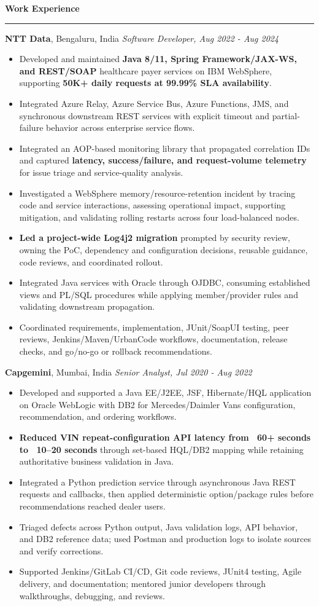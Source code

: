 \documentclass[11pt,letterpaper]{article}
\newcommand{\ressection}[1]{\Needspace{6\baselineskip}\vspace{8pt}\par\textbf{#1}\par\vspace{2pt}\hrule\vspace{5pt}}
\begin{document}
\ressection{Work Experience}
\textbf{NTT Data}, Bengaluru, India \hfill \textit{Software Developer, Aug 2022 - Aug 2024}
\begin{itemize}
  \item Developed and maintained \textbf{Java 8/11, Spring Framework/JAX-WS, and REST/SOAP} healthcare payer services on IBM WebSphere, supporting \textbf{50K+ daily requests at 99.99\% SLA availability}.
  \item Integrated Azure Relay, Azure Service Bus, Azure Functions, JMS, and synchronous downstream REST services with explicit timeout and partial-failure behavior across enterprise service flows.
  \item Integrated an AOP-based monitoring library that propagated correlation IDs and captured \textbf{latency, success/failure, and request-volume telemetry} for issue triage and service-quality analysis.
  \item Investigated a WebSphere memory/resource-retention incident by tracing code and service interactions, assessing operational impact, supporting mitigation, and validating rolling restarts across four load-balanced nodes.
  \item \textbf{Led a project-wide Log4j2 migration} prompted by security review, owning the PoC, dependency and configuration decisions, reusable guidance, code reviews, and coordinated rollout.
  \item Integrated Java services with Oracle through OJDBC, consuming established views and PL/SQL procedures while applying member/provider rules and validating downstream propagation.
  \item Coordinated requirements, implementation, JUnit/SoapUI testing, peer reviews, Jenkins/Maven/UrbanCode workflows, documentation, release checks, and go/no-go or rollback recommendations.
\end{itemize}
\textbf{Capgemini}, Mumbai, India \hfill \textit{Senior Analyst, Jul 2020 - Aug 2022}
\begin{itemize}
  \item Developed and supported a Java EE/J2EE, JSF, Hibernate/HQL application on Oracle WebLogic with DB2 for Mercedes/Daimler Vans configuration, recommendation, and ordering workflows.
  \item \textbf{Reduced VIN repeat-configuration API latency from ~60+ seconds to ~10--20 seconds} through set-based HQL/DB2 mapping while retaining authoritative business validation in Java.
  \item Integrated a Python prediction service through asynchronous Java REST requests and callbacks, then applied deterministic option/package rules before recommendations reached dealer users.
  \item Triaged defects across Python output, Java validation logs, API behavior, and DB2 reference data; used Postman and production logs to isolate sources and verify corrections.
  \item Supported Jenkins/GitLab CI/CD, Git code reviews, JUnit4 testing, Agile delivery, and documentation; mentored junior developers through walkthroughs, debugging, and reviews.
\end{itemize}
\end{document}

